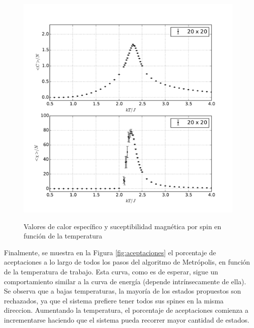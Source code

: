 \documentclass[a4paper,12pt]{article}
\begin{document}
\begin{figure}[H]
    \begin{center}
      \includegraphics[scale=0.7]{fluctuaciones.pdf} \\
      \caption{Valores de calor específico y suceptibilidad magnética por spin 
      en función de la temperatura} \label{fig:fluctuaciones}
    \end{center}
\end{figure}

Finalmente, se muestra en la Figura \eqref{fig:aceptaciones} el porcentaje de 
aceptaciones a lo largo de todos los pasos del algoritmo de Metrópolis, en 
función de la temperatura de trabajo. Esta curva, como es de esperar, sigue un 
comportamiento similar a la curva de energía (depende intrínsecamente de ella). 
Se observa que a bajas temperaturas, la mayoría de los estados propuestos son 
rechazados, ya que el sistema prefiere tener todos sus spines en la misma 
direccion. Aumentando la temperatura, el porcentaje de aceptaciones comienza a 
incrementarse haciendo que el sistema pueda recorrer mayor cantidad de estados.
\end{document}
